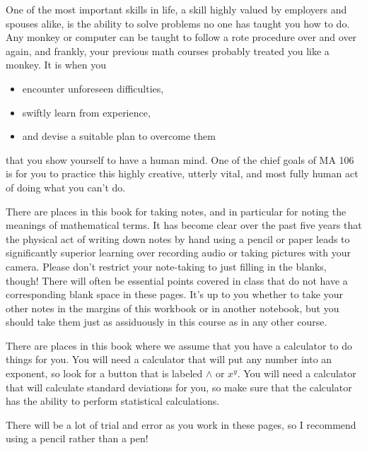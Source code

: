 \documentclass[12pt,leqno]{book}
\begin{document}
One of the most important skills in life, a skill highly valued by employers and spouses alike,
is the ability to solve problems no one has taught you how to do.
Any monkey or computer can be taught to follow a rote procedure over and over again,
and frankly, your previous math courses probably treated you like a monkey.
It is when you
  \begin{itemize}
		\item encounter unforeseen difficulties,
		\item swiftly learn from experience,
		\item and devise a suitable plan to overcome them
	\end{itemize}
that you show yourself to have a human mind.
One of the chief goals of MA 106
is for you to practice this highly creative, utterly vital, and most fully human act
of doing what you can't do.

There are places in this book for taking notes, and in particular for noting the meanings of mathematical terms. It has become clear over the past five years that the physical act of writing down notes by hand using a pencil or paper leads to significantly superior learning over recording audio or taking pictures with your camera.
Please don't restrict your note-taking to just filling in the blanks, though!
There will often be essential points covered in class
that do not have a corresponding blank space in these pages.
It's up to you whether to take your other notes in the margins of this workbook or in another notebook,
but you should take them just as assiduously in this course as in any other course.

There are places in this book where we assume that you have a calculator to do things for you.  You will need a calculator that will put any number into an exponent, so look for a button that is labeled $\wedge$ or $x^y$.  You will need a calculator that will calculate standard deviations for you, so make sure that the calculator has the ability to perform statistical calculations.

There will be a lot of trial and error as you work in these pages,
so I recommend using a pencil rather than a pen!

~\ifodd\value{page}\relax\else\newpage\fi


\mainmatter

\pagestyle{fancy}

%





\appendix


\clearpage
{}

\printindex
\end{document}
